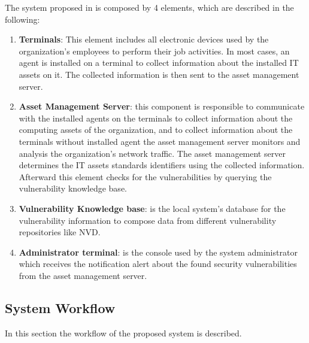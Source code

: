 \documentclass{llncs}
\begin{document}
\par The system proposed in \cite{paper1} is composed by 4 elements, which are described in the following:


 \begin{enumerate}
 \item \textbf{Terminals}: This element includes all electronic devices used by the organization's employees to perform their job activities. In most cases, an agent is installed on a terminal to collect information about the installed IT assets on it. The collected information is then sent to the asset management server.
 
 \item \textbf{Asset Management Server}: this component is responsible to communicate with the installed agents on the terminals to collect information about the computing assets of the organization, and to collect information about the terminals without installed agent the asset management server monitors and analysis the organization's network traffic. The asset management server determines the IT assets standards identifiers using the collected information. Afterward this element checks for the vulnerabilities by querying the vulnerability knowledge base.
 
 \item \textbf{Vulnerability Knowledge base}: is the local system's database for the vulnerability information to compose data from different vulnerability repositories like NVD.
 
 
  \item \textbf{Administrator terminal}: is the console used by the system administrator which receives the notification alert about the found  security vulnerabilities from the asset management server.     
 \end{enumerate}
 
\subsection{System Workflow}

\par In this section the workflow of the proposed system is described.
 
\end{document}
